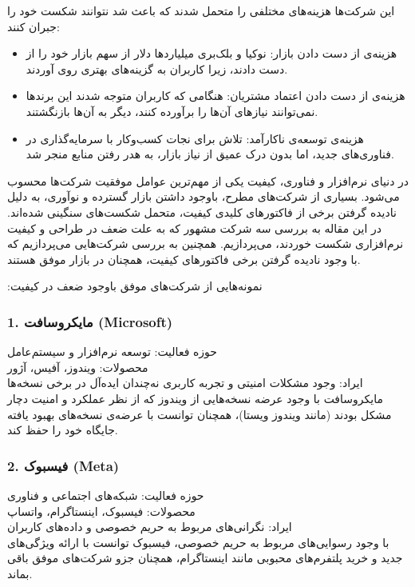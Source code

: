 این شرکت‌ها هزینه‌های مختلفی را متحمل شدند که باعث شد نتوانند شکست خود را جبران کنند:
\begin{itemize}
    \item {هزینه‌ی از دست دادن بازار:} نوکیا و بلک‌بری میلیاردها دلار از سهم بازار خود را از دست دادند، زیرا کاربران به گزینه‌های بهتری روی آوردند.
    \item {هزینه‌ی از دست دادن اعتماد مشتریان:} هنگامی که کاربران متوجه شدند این برندها نمی‌توانند نیازهای آن‌ها را برآورده کنند، دیگر به آن‌ها بازنگشتند.
    \item {هزینه‌ی توسعه‌ی ناکارآمد:} تلاش برای نجات کسب‌وکار با سرمایه‌گذاری در فناوری‌های جدید، اما بدون درک عمیق از نیاز بازار، به هدر رفتن منابع منجر شد.
\end{itemize}





در دنیای نرم‌افزار و فناوری، کیفیت یکی از مهم‌ترین عوامل موفقیت شرکت‌ها محسوب می‌شود. بسیاری از شرکت‌های مطرح، باوجود داشتن بازار گسترده و نوآوری، به دلیل نادیده گرفتن برخی از فاکتورهای کلیدی کیفیت، متحمل شکست‌های سنگینی شده‌اند. در این مقاله به بررسی سه شرکت مشهور که به علت ضعف در طراحی و کیفیت نرم‌افزاری شکست خوردند، می‌پردازیم. همچنین به بررسی شرکت‌هایی می‌پردازیم که با وجود نادیده گرفتن برخی فاکتورهای کیفیت، همچنان در بازار موفق هستند.

{:نمونه‌هایی از شرکت‌های موفق باوجود ضعف در کیفیت}

\subsubsection*{1. مایکروسافت (Microsoft)}
{حوزه فعالیت:} توسعه نرم‌افزار و سیستم‌عامل\\
{محصولات:} ویندوز، آفیس، آژور\\
{ایراد:} وجود مشکلات امنیتی و تجربه کاربری نه‌چندان ایده‌آل در برخی نسخه‌ها\\
مایکروسافت با وجود عرضه نسخه‌هایی از ویندوز که از نظر عملکرد و امنیت دچار مشکل بودند (مانند ویندوز ویستا)، همچنان توانست با عرضه‌ی نسخه‌های بهبود یافته جایگاه خود را حفظ کند.

\subsubsection*{2. فیسبوک (Meta)}
{حوزه فعالیت:} شبکه‌های اجتماعی و فناوری\\
{محصولات:} فیسبوک، اینستاگرام، واتساپ\\
{ایراد:} نگرانی‌های مربوط به حریم خصوصی و داده‌های کاربران\\
با وجود رسوایی‌های مربوط به حریم خصوصی، فیسبوک توانست با ارائه ویژگی‌های جدید و خرید پلتفرم‌های محبوبی مانند اینستاگرام، همچنان جزو شرکت‌های موفق باقی بماند.

